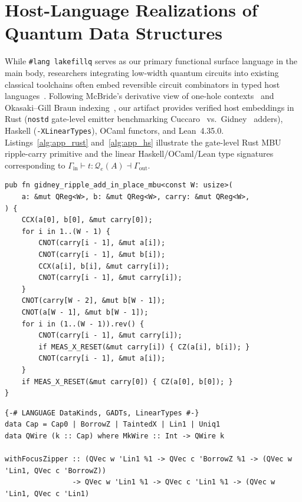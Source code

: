 \documentclass[acmsmall,screen,anonymous]{acmart}
\DeclareRobustCommand{\_}{\ifmmode\text{\char95}\else\char95\penalty0\relax\fi}
\theoremstyle{plain}
\begin{document}


\appendix

\section{Host-Language Realizations of Quantum Data Structures}
\label{app:listings}

While \texttt{\#lang lakefillq} serves as our primary functional surface language in the main body, researchers integrating low-width quantum circuits into existing classical toolchains often embed reversible circuit combinators in typed host languages~\cite{altenkirch2005,selinger2006,rios2017,fu2020}. Following McBride's derivative view of one-hole contexts~\cite{mcbride2001} and Okasaki--Gill Braun indexing~\cite{okasakigill1998}, our artifact provides verified host embeddings in Rust (\texttt{no\_std} gate-level emitter benchmarking Cuccaro~\cite{cuccaro2004} vs.\ Gidney~\cite{gidney2018} adders), Haskell (\texttt{-XLinearTypes}), OCaml functors, and Lean~4.35.0. Listings~\ref{alg:app_rust} and~\ref{alg:app_hs} illustrate the gate-level Rust MBU ripple-carry primitive and the linear Haskell/OCaml/Lean type signatures corresponding to $\Gamma_{\mathrm{in}} \vdash t : \mathcal{Q}_{e}(A) \dashv \Gamma_{\mathrm{out}}$.

\begin{lstlisting}[language=LakefillRust,caption={Gate-level Rust \texttt{no\_std} emitter for Gidney's degree-2 MBU ripple-carry adder ($W - 1$ forward Toffolis, 0 reverse Toffolis).},label={alg:app_rust}]
pub fn gidney_ripple_add_in_place_mbu<const W: usize>(
    a: &mut QReg<W>, b: &mut QReg<W>, carry: &mut QReg<W>,
) {
    CCX(a[0], b[0], &mut carry[0]);
    for i in 1..(W - 1) {
        CNOT(carry[i - 1], &mut a[i]);
        CNOT(carry[i - 1], &mut b[i]);
        CCX(a[i], b[i], &mut carry[i]);
        CNOT(carry[i - 1], &mut carry[i]);
    }
    CNOT(carry[W - 2], &mut b[W - 1]);
    CNOT(a[W - 1], &mut b[W - 1]);
    for i in (1..(W - 1)).rev() {
        CNOT(carry[i - 1], &mut carry[i]);
        if MEAS_X_RESET(&mut carry[i]) { CZ(a[i], b[i]); }
        CNOT(carry[i - 1], &mut a[i]);
    }
    if MEAS_X_RESET(&mut carry[0]) { CZ(a[0], b[0]); }
}
\end{lstlisting}

\begin{lstlisting}[language=LakefillHaskell,caption={Linear Haskell (\texttt{-XLinearTypes}) GADT signature encoding the five-point wire capability scale and scoped focus-zipper invariant.},label={alg:app_hs}]
{-# LANGUAGE DataKinds, GADTs, LinearTypes #-}
data Cap = Cap0 | BorrowZ | TaintedX | Lin1 | Uniq1
data QWire (k :: Cap) where MkWire :: Int -> QWire k

withFocusZipper :: (QVec w 'Lin1 %1 -> QVec c 'BorrowZ %1 -> (QVec w 'Lin1, QVec c 'BorrowZ))
                -> QVec w 'Lin1 %1 -> QVec c 'Lin1 %1 -> (QVec w 'Lin1, QVec c 'Lin1)
\end{lstlisting}
\end{document}
